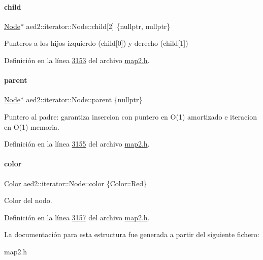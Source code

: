 \paragraph{\texorpdfstring{child}{child}}
{\footnotesize\ttfamily \hyperlink{structaed2_1_1iterator_1_1Node}{Node}$\ast$ aed2\+::iterator\+::\+Node\+::child\mbox{[}2\mbox{]} \{nullptr, nullptr\}}



Punteros a los hijos izquierdo (child\mbox{[}0\mbox{]}) y derecho (child\mbox{[}1\mbox{]}) 



Definición en la línea \hyperlink{map2_8h_source_l03153}{3153} del archivo \hyperlink{map2_8h_source}{map2.\+h}.

\mbox{\label{structaed2_1_1iterator_1_1Node_a7f097f76a613a17fc9d03c8f153cb5e4_a7f097f76a613a17fc9d03c8f153cb5e4}} 
\paragraph{\texorpdfstring{parent}{parent}}
{\footnotesize\ttfamily \hyperlink{structaed2_1_1iterator_1_1Node}{Node}$\ast$ aed2\+::iterator\+::\+Node\+::parent \{nullptr\}}



Puntero al padre\+: garantiza insercion con puntero en O(1) amortizado e iteracion en O(1) memoria. 



Definición en la línea \hyperlink{map2_8h_source_l03155}{3155} del archivo \hyperlink{map2_8h_source}{map2.\+h}.

\mbox{\label{structaed2_1_1iterator_1_1Node_a07d4b83de27938ece64e1a6db4a055cc_a07d4b83de27938ece64e1a6db4a055cc}} 
\paragraph{\texorpdfstring{color}{color}}
{\footnotesize\ttfamily \hyperlink{classaed2_1_1iterator_aaa188f82ba585d8de525b1400242cf4f_aaa188f82ba585d8de525b1400242cf4f}{Color} aed2\+::iterator\+::\+Node\+::color \{Color\+::\+Red\}}



Color del nodo. 



Definición en la línea \hyperlink{map2_8h_source_l03157}{3157} del archivo \hyperlink{map2_8h_source}{map2.\+h}.



La documentación para esta estructura fue generada a partir del siguiente fichero\+:\begin{DoxyCompactItemize}
\item 
map2.\+h\end{DoxyCompactItemize}
